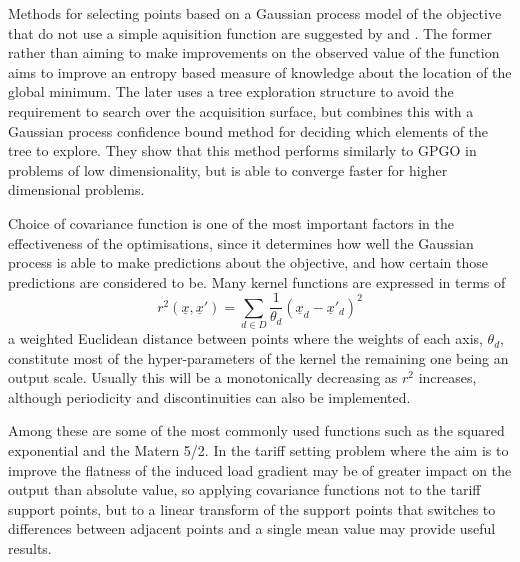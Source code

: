 \documentclass[a4paper, 10 pt, conference]{ieeeconf}  %
\begin{document}
Methods for selecting points based on a Gaussian process model of the objective that do not use a simple aquisition function are suggested by \cite{hennig2012entropy} and \cite{wang2014bayesian}. The former rather than aiming to make improvements on the observed value of the function aims to improve an entropy based measure of knowledge about the location of the global minimum. The later uses a tree exploration structure to avoid the requirement to search over the acquisition surface, but combines this with a Gaussian process confidence bound method for deciding which elements of the tree to explore. They show that this method performs similarly to GPGO in problems of low dimensionality, but is able to converge faster for higher dimensional problems.

Choice of covariance function is one of the most important factors in the effectiveness of the optimisations, since it determines how well the Gaussian process is able to make predictions about the objective, and how certain those predictions are considered to be. Many kernel functions are expressed in terms of 
\begin{equation}
\label{euclid}
r^{2}(\underline{x},\underline{x}') = \sum_{d \in D}\frac{1}{\theta_{d}}(\underline{x}_{d}-\underline{x}'_{d})^{2} 
\end{equation}
a weighted Euclidean distance between points where the weights of each axis, $\theta_{d}$, constitute most of the hyper-parameters of the kernel the remaining one being an output scale. Usually this will be a monotonically decreasing as $r^{2}$ increases, although periodicity and discontinuities can also be implemented. 

Among these are some of the most commonly used functions such as the squared exponential and the Matern 5/2. In the tariff setting problem where the aim is to improve the flatness of the induced load gradient may be of greater impact on the output than absolute value, so applying covariance functions not to the tariff support points, but to a linear transform of the support points that switches to differences between adjacent points and a single mean value may provide useful results.
\end{document}
